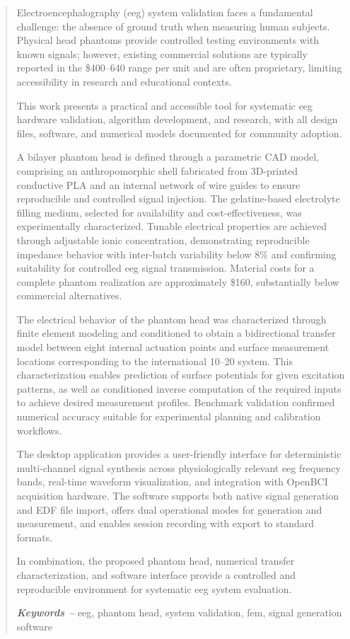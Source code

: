 \documentclass[../00_Main.tex]{subfiles}
\begin{document}

\begin{abstract}
Electroencephalography (\gls{eeg}) system validation faces a fundamental challenge: the absence of ground truth when measuring human subjects. Physical head phantoms provide controlled testing environments with known signals; however, existing commercial solutions are typically reported in the \$400--640 range per unit and are often proprietary, limiting accessibility in research and educational contexts.

This work presents a practical and accessible tool for systematic \gls{eeg} hardware validation, algorithm development, and research, with all design files, software, and numerical models documented for community adoption.

A bilayer phantom head is defined through a parametric CAD model, comprising an anthropomorphic shell fabricated from 3D-printed conductive PLA and an internal network of wire guides to ensure reproducible and controlled signal injection. The gelatine-based electrolyte filling medium, selected for availability and cost-effectiveness, was experimentally characterized. Tunable electrical properties are achieved through adjustable ionic concentration, demonstrating reproducible impedance behavior with inter-batch variability below 8\% and confirming suitability for controlled \gls{eeg} signal transmission. Material costs for a complete phantom realization are approximately \$160, substantially below commercial alternatives.

The electrical behavior of the phantom head was characterized through finite element modeling and conditioned to obtain a bidirectional transfer model between eight internal actuation points and surface measurement locations corresponding to the international 10--20 system. This characterization enables prediction of surface potentials for given excitation patterns, as well as conditioned inverse computation of the required inputs to achieve desired measurement profiles. Benchmark validation confirmed numerical accuracy suitable for experimental planning and calibration workflows.

The desktop application provides a user-friendly interface for deterministic multi-channel signal synthesis across physiologically relevant \gls{eeg} frequency bands, real-time waveform visualization, and integration with OpenBCI acquisition hardware. The software supports both native signal generation and EDF file import, offers dual operational modes for generation and measurement, and enables session recording with export to standard formats.

In combination, the proposed phantom head, numerical transfer characterization, and software interface provide a controlled and reproducible environment for systematic \gls{eeg} system evaluation.

\vspace{.6em}
\textbf{\textit{Keywords --}} \gls{eeg}, phantom head, system validation, \gls{fem}, signal generation software

\end{abstract}

\restoregeometry
\end{document}
